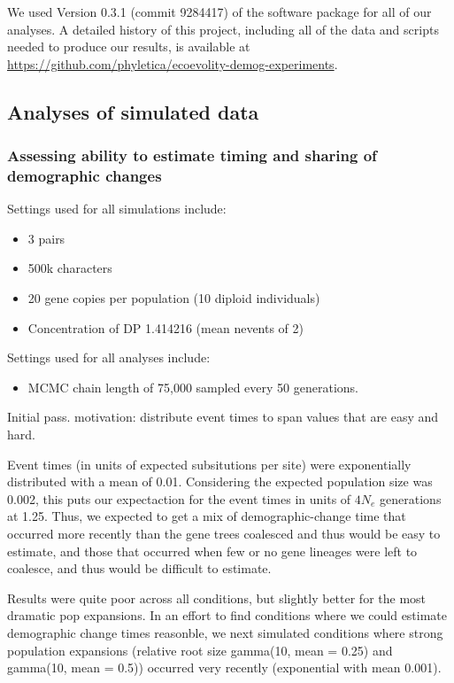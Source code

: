 \begin{linenomath}
We used Version 0.3.1 
(commit 9284417)
of the \ecoevolity software package for all of our analyses.
A detailed history of this project, including all of the data and scripts
needed to produce our results, is available at
\url{https://github.com/phyletica/ecoevolity-demog-experiments}.

\subsection{Analyses of simulated data}

\subsubsection{Assessing ability to estimate timing and sharing of demographic changes}

Settings used for all simulations include:
\begin{itemize}
    \item 3 pairs
    \item 500k characters
    \item 20 gene copies per population (10 diploid individuals)
    \item Concentration of DP 1.414216 (mean nevents of 2)
\end{itemize}

Settings used for all analyses include:
\begin{itemize}
    \item MCMC chain length of 75,000 sampled every 50 generations.
\end{itemize}

Initial pass. motivation: distribute event times to span values that are easy and hard.

Event times (in units of expected subsitutions per site) were exponentially
distributed with a mean of 0.01.
Considering the expected population size was 0.002, this puts our expectaction
for the event times in units of $4N_e$ generations at 1.25.
Thus, we expected to get a mix of demographic-change time that occurred more recently
than the gene trees coalesced and thus would be easy to estimate,
and those that occurred when few or no gene lineages were left to coalesce, and thus would
be difficult to estimate.

Results were quite poor across all conditions, but slightly better for the most dramatic pop expansions.
In an effort to find conditions where we could estimate demographic change times reasonble, we next simulated conditions where strong population expansions (relative root size gamma(10, mean = 0.25) and gamma(10, mean = 0.5)) occurred very recently (exponential with mean 0.001).


\end{linenomath}
